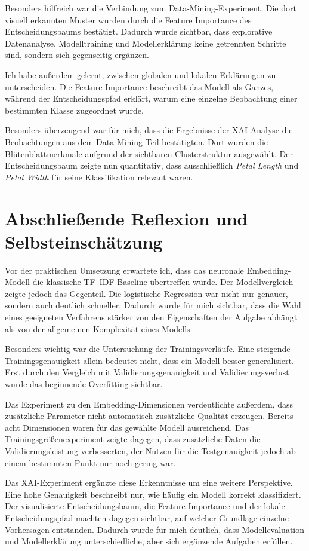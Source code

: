 \documentclass[12pt,a4paper]{article}
\begin{document}
Besonders hilfreich war die Verbindung zum Data-Mining-Experiment.
Die dort visuell erkannten Muster wurden durch die Feature
Importance des Entscheidungsbaums bestätigt. Dadurch wurde sichtbar,
dass explorative Datenanalyse, Modelltraining und Modellerklärung
keine getrennten Schritte sind, sondern sich gegenseitig ergänzen.

Ich habe außerdem gelernt, zwischen globalen und lokalen Erklärungen
zu unterscheiden. Die Feature Importance beschreibt das Modell als
Ganzes, während der Entscheidungspfad erklärt, warum eine einzelne
Beobachtung einer bestimmten Klasse zugeordnet wurde.

Besonders überzeugend war für mich, dass die Ergebnisse der
XAI-Analyse die Beobachtungen aus dem Data-Mining-Teil bestätigten.
Dort wurden die Blütenblattmerkmale aufgrund der sichtbaren
Clusterstruktur ausgewählt. Der Entscheidungsbaum zeigte nun
quantitativ, dass ausschließlich \textit{Petal Length} und
\textit{Petal Width} für seine Klassifikation relevant waren.
\section{Abschließende Reflexion und Selbsteinschätzung}

Vor der praktischen Umsetzung erwartete ich, dass das neuronale
Embedding-Modell die klassische TF--IDF-Baseline übertreffen würde.
Der Modellvergleich zeigte jedoch das Gegenteil. Die logistische
Regression war nicht nur genauer, sondern auch deutlich schneller.
Dadurch wurde für mich sichtbar, dass die Wahl eines geeigneten
Verfahrens stärker von den Eigenschaften der Aufgabe abhängt als von
der allgemeinen Komplexität eines Modells.

Besonders wichtig war die Untersuchung der Trainingsverläufe. Eine
steigende Trainingsgenauigkeit allein bedeutet nicht, dass ein Modell
besser generalisiert. Erst durch den Vergleich mit
Validierungsgenauigkeit und Validierungsverlust wurde das beginnende
Overfitting sichtbar.

Das Experiment zu den Embedding-Dimensionen verdeutlichte außerdem,
dass zusätzliche Parameter nicht automatisch zusätzliche Qualität
erzeugen. Bereits acht Dimensionen waren für das gewählte Modell
ausreichend. Das Trainingsgrößenexperiment zeigte dagegen, dass
zusätzliche Daten die Validierungsleistung verbesserten, der Nutzen
für die Testgenauigkeit jedoch ab einem bestimmten Punkt nur noch
gering war.

Das XAI-Experiment ergänzte diese Erkenntnisse um eine weitere
Perspektive. Eine hohe Genauigkeit beschreibt nur, wie häufig ein
Modell korrekt klassifiziert. Der visualisierte Entscheidungsbaum,
die Feature Importance und der lokale Entscheidungspfad machten
dagegen sichtbar, auf welcher Grundlage einzelne Vorhersagen
entstanden. Dadurch wurde für mich deutlich, dass Modellevaluation
und Modellerklärung unterschiedliche, aber sich ergänzende Aufgaben
erfüllen.
\end{document}
